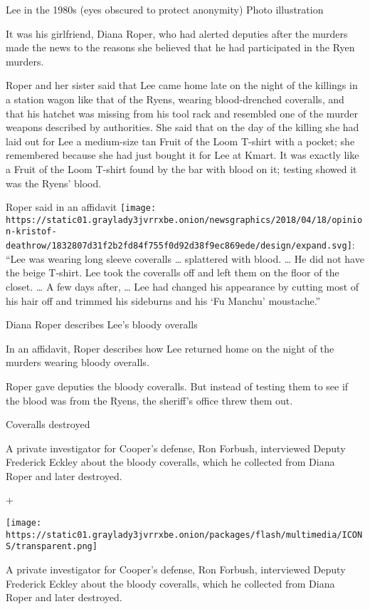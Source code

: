 Lee in the 1980s (eyes obscured to protect anonymity) Photo illustration

It was his girlfriend, Diana Roper, who had alerted deputies after the
murders made the news to the reasons she believed that he had
participated in the Ryen murders.

Roper and her sister said that Lee came home late on the night of the
killings in a station wagon like that of the Ryens, wearing
blood-drenched coveralls, and that his hatchet was missing from his tool
rack and resembled one of the murder weapons described by authorities.
She said that on the day of the killing she had laid out for Lee a
medium-size tan Fruit of the Loom T-shirt with a pocket; she remembered
because she had just bought it for Lee at Kmart. It was exactly like a
Fruit of the Loom T-shirt found by the bar with blood on it; testing
showed it was the Ryens' blood.

Roper said in an affidavit
\texttt{[image: https://static01.graylady3jvrrxbe.onion/newsgraphics/2018/04/18/opinion-kristof-deathrow/1832807d31f2b2fd84f755f0d92d38f9ec869ede/design/expand.svg]}:
``Lee was wearing long sleeve coveralls \ldots{} splattered with blood.
\ldots{} He did not have the beige T-shirt. Lee took the coveralls off
and left them on the floor of the closet. \ldots{} A few days after,
\ldots{} Lee had changed his appearance by cutting most of his hair off
and trimmed his sideburns and his `Fu Manchu' moustache.''

Diana Roper describes Lee's bloody overalls

In an affidavit, Roper describes how Lee returned home on the night of
the murders wearing bloody overalls.

Roper gave deputies the bloody coveralls. But instead of testing them to
see if the blood was from the Ryens, the sheriff's office threw them
out.

Coveralls destroyed

A private investigator for Cooper's defense, Ron Forbush, interviewed
Deputy Frederick Eckley about the bloody coveralls, which he collected
from Diana Roper and later destroyed.

+

\texttt{[image: https://static01.graylady3jvrrxbe.onion/packages/flash/multimedia/ICONS/transparent.png]}

A private investigator for Cooper's defense, Ron Forbush, interviewed
Deputy Frederick Eckley about the bloody coveralls, which he collected
from Diana Roper and later destroyed.


